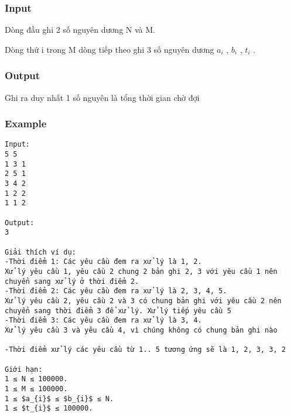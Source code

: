 \subsubsection{Input}

Dòng đầu ghi 2 số nguyên dương N và M.

Dòng thứ i trong M dòng tiếp theo ghi 3 số nguyên dương $a_{i}$ , $b_{i}$ , $t_{i}$ .

\subsubsection{Output}

Ghi ra duy nhất 1 số nguyên là tổng thời gian chờ đợi

\subsubsection{Example}
\begin{verbatim}
Input:
5 5
1 3 1
2 5 1
3 4 2
1 2 2
1 1 2

Output:
3

Giải thích ví dụ: 
-Thời điểm 1: Các yêu cầu đem ra xử lý là 1, 2.
Xử lý yêu cầu 1, yêu cầu 2 chung 2 bản ghi 2, 3 với yêu cầu 1 nên chuyển sang xử lý ở thời điểm 2.
-Thời điểm 2: Các yêu cầu đem ra xử lý là 2, 3, 4, 5.
Xử lý yêu cầu 2, yêu cầu 2 và 3 có chung bản ghi với yêu cầu 2 nên chuyển sang thời điểm 3 để xử lý. Xử lý tiếp yêu cầu 5
-Thời điểm 3: Các yêu cầu đem ra xử lý là 3, 4.
Xử lý yêu cầu 3 và yêu cầu 4, vì chúng không có chung bản ghi nào

-Thời điểm xử lý các yêu cầu từ 1.. 5 tương ứng sẽ là 1, 2, 3, 3, 2

Giới hạn:
1 ≤ N ≤ 100000. 
1 ≤ M ≤ 100000.
1 ≤ $a_{i}$ ≤ $b_{i}$ ≤ N. 
1 ≤ $t_{i}$ ≤ 100000. 

\end{verbatim}

